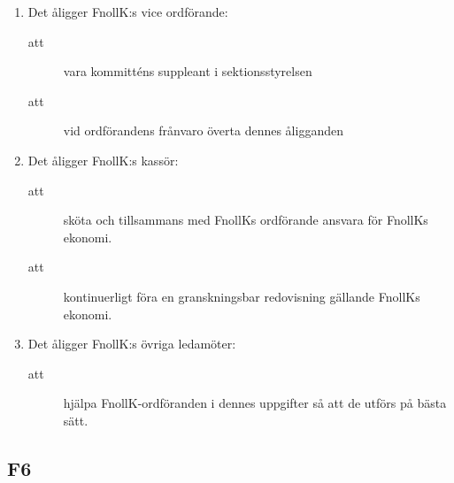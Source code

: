 \documentclass[11pt,a4paper]{article}
\begin{document}
\begin{enumerate}[\thesubsection .1]
\item Det åligger FnollK:s vice ordförande:
\begin{description}
 \item[att] vara kommitténs suppleant i sektionsstyrelsen
 \item[att] vid ordförandens frånvaro överta dennes åligganden
\end{description}

  \item Det åligger FnollK:s kassör:
    \begin{description}
      \item[att] sköta och tillsammans med FnollKs ordförande an\-sva\-ra för FnollKs ekonomi.
      \item[att] kontinuerligt föra en granskningsbar redovisning gällande FnollKs  ekonomi.
    \end{description}


  \item Det åligger FnollK:s övriga ledamöter:
    \begin{description}
      \item[att] hjälpa FnollK-ordföranden i dennes uppgifter så att de utförs på bästa sätt.
    \end{description}

\end{enumerate}

\subsection{F6}
\end{document}
